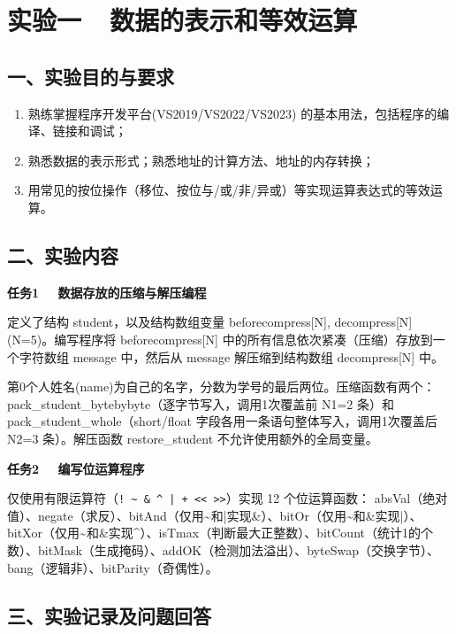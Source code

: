 \setcounter{page}{1}
\section*{实验一\ \ 数据的表示和等效运算}

\subsection*{一、实验目的与要求}

\begin{enumerate}[label=（\arabic*）,nosep,leftmargin=*]
    \item 熟练掌握程序开发平台(VS2019/VS2022/VS2023) 的基本用法，包括程序的编译、链接和调试；
    \item 熟悉数据的表示形式；熟悉地址的计算方法、地址的内存转换；
    \item 用常见的按位操作（移位、按位与/或/非/异或）等实现运算表达式的等效运算。
\end{enumerate}

\subsection*{二、实验内容}

\textbf{任务1 \ \ 数据存放的压缩与解压编程}

定义了结构 student，以及结构数组变量 beforecompress[N], decompress[N] (N=5)。编写程序将 beforecompress[N] 中的所有信息依次紧凑（压缩）存放到一个字符数组 message 中，然后从 message 解压缩到结构数组 decompress[N] 中。

第0个人姓名(name)为自己的名字，分数为学号的最后两位。压缩函数有两个：pack\_student\_bytebybyte（逐字节写入，调用1次覆盖前 N1=2 条）和 pack\_student\_whole（short/float 字段各用一条语句整体写入，调用1次覆盖后 N2=3 条）。解压函数 restore\_student 不允许使用额外的全局变量。

\textbf{任务2 \ \ 编写位运算程序}

仅使用有限运算符（\texttt{! \~{} \& \^{} | + << >>}）实现 12 个位运算函数：
absVal（绝对值）、negate（求反）、bitAnd（仅用\~{}和|实现\&）、bitOr（仅用\~{}和\&实现|）、bitXor（仅用\~{}和\&实现\^{}）、isTmax（判断最大正整数）、bitCount（统计1的个数）、bitMask（生成掩码）、addOK（检测加法溢出）、byteSwap（交换字节）、bang（逻辑非）、bitParity（奇偶性）。

\subsection*{三、实验记录及问题回答}


